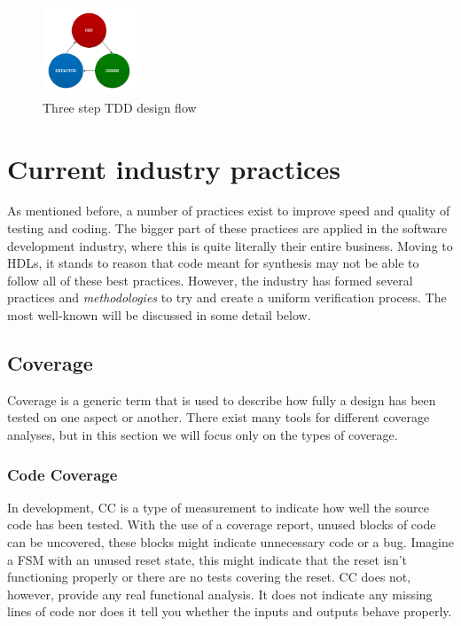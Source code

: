 \documentclass[11pt,british]{article}
\begin{document}
\begin{figure}[h]
    \centering
	\includegraphics[width=0.25\textwidth]{images/tdd.pdf}
    \caption{Three step TDD design flow}
    \label{fig:TDD_Flow}
\end{figure}

\newpage
\section{Current industry practices}
As mentioned before, a number of practices exist to improve speed and quality of testing and coding. The bigger part of these practices are applied in the software development industry, where this is quite literally their entire business. Moving to \gls{HDL}s, it stands to reason that code meant for synthesis may not be able to follow all of these best practices. However, the industry has formed several practices and \emph{methodologies} to try and create a uniform verification process. The most well-known will be discussed in some detail below.

\subsection{Coverage}
Coverage is a generic term that is used to describe how fully a design has been tested on one aspect or another. There exist many tools for different coverage analyses, but in this section we will focus only on the types of coverage.

\subsubsection*{Code Coverage}
In development, \gls{CC} is a type of measurement to indicate how well the source code has been tested. With the use of a coverage report, unused blocks of code can be uncovered, these blocks might indicate unnecessary code or a bug. Imagine a \gls{FSM} with an unused reset state, this might indicate that the reset isn't functioning properly or there are no tests covering the reset. CC does not, however, provide any real functional analysis. It does not indicate any missing lines of code nor does it tell you whether the inputs and outputs behave properly.
\end{document}
